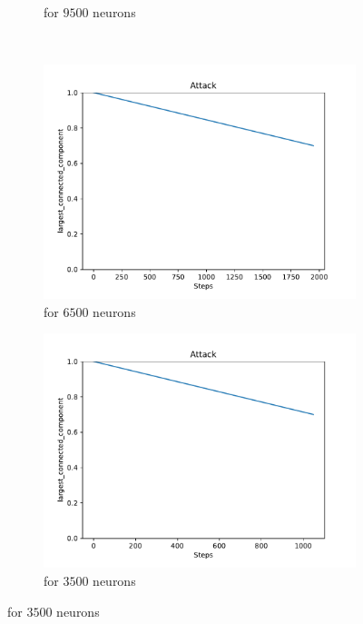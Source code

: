 \begin{figure}
\begin{subfigure}[b]{0.45\textwidth}
		\caption{for $9500$ neurons}
	\end{subfigure}
	\\ \vspace{5mm}
	\begin{subfigure}[b]{0.45\textwidth}
		\centering
		\includegraphics[width=\textwidth]{Images/plots_rnd/rnd_28.pdf}
		\caption{for $6500$ neurons}
	\end{subfigure}
	\hfill
	\begin{subfigure}[b]{0.45\textwidth}
		\centering
		\includegraphics[width=\textwidth]{Images/plots_rnd/rnd_34.pdf}
		\caption{for $3500$ neurons}
	\end{subfigure}

\end{figure}
